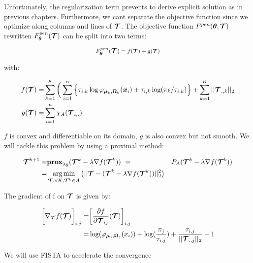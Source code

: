 Unfortunately, the regularization term prevents to derive explicit solution as in previous chapters. Furthermore, we cant separate the objective function since we optimize along columns and lines of $\boldsymbol{\mathcal T}$. The objective function $F^{pen}({\boldsymbol\theta},\boldsymbol{\mathcal T})$ rewritten
$F^{pen}_{{\boldsymbol\theta}}(\boldsymbol{\mathcal T})$ can be split into two terms:

\begin{equation}
F^{pen}_{{\boldsymbol\theta}}(\boldsymbol{\mathcal T})={\large f}({\footnotesize
\boldsymbol{\mathcal T}})+ {\large g}({\footnotesize
\boldsymbol{\mathcal T}})
\end{equation}

with:

\begin{align*}
f(\boldsymbol{\mathcal T}) =& 	\sum_{k=1}^K \bigg(\sum_{i=1}^{n} \Big\{\tau_{i,k}\log\varphi_{\boldsymbol\mu_{k},\boldsymbol\Omega_{k}}(\boldsymbol x_i)+\tau_{i,k} \log(\pi_k/\tau_{i,k})\Big\} + \sum_{k=1}^K ||\boldsymbol{\mathcal T}_{.,k}||_{2}\\
g(\boldsymbol{\mathcal T}) =& \sum_{i=1}^{n} \chi_A(\boldsymbol{\mathcal T}_{i,.})
\end{align*}

$f$ is convex and differentiable on its domain, $g$ is also convex but not smooth. We will tackle this problem by using a proximal method:

\begin{align*}
	\boldsymbol{\mathcal T}^{k+1} =& {\bf{prox}}_{\lambda g}(\boldsymbol{\mathcal T}^k - \lambda \nabla f(\boldsymbol{\mathcal T}^k))\
			=& P_A(\boldsymbol{\mathcal T}^k - \lambda \nabla f(\boldsymbol{\mathcal T}^k))\\
			=&\operatorname*{arg\,min}_{ \boldsymbol{\mathcal T} : \forall K, \boldsymbol{\mathcal T}^k \in A}\big( || \boldsymbol{\mathcal T} - (\boldsymbol{\mathcal T}^k - \lambda \nabla f(\boldsymbol{\mathcal T}^k) ) ||^2_2 \big)
\end{align*}

The gradient of f on $\boldsymbol{\mathcal T}$ is given by:

\begin{align*}
\bigg[\nabla_{\boldsymbol{\mathcal T}}f(\boldsymbol{\mathcal T})\bigg]_{i,j} =& \bigg[\frac{\partial f}{\partial \boldsymbol{\mathcal T}_{ij}}(\boldsymbol{\mathcal T}) \bigg]_{i,j}\\
=& \log(\varphi_{\boldsymbol\mu_j,\boldsymbol\Omega_j}(x_i))+\log(\frac{\pi_j}{\tau_{i,j}})+\frac{\tau_{i,j}}{||\boldsymbol{\mathcal T}_{.,j}||_2}-1
\end{align*}

We will use FISTA to accelerate the convergence

